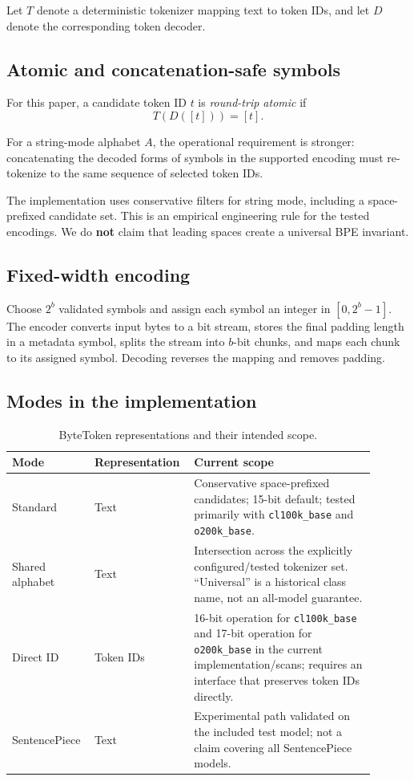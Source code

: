 \documentclass[11pt,a4paper]{article}
\begin{document}
Let \(T\) denote a deterministic tokenizer mapping text to token IDs, and let \(D\) denote the corresponding token decoder.

\subsection{Atomic and concatenation-safe symbols}

For this paper, a candidate token ID \(t\) is \emph{round-trip atomic} if
\[
T(D([t])) = [t].
\]

For a string-mode alphabet \(A\), the operational requirement is stronger: concatenating the decoded forms of symbols in the supported encoding must re-tokenize to the same sequence of selected token IDs.

The implementation uses conservative filters for string mode, including a space-prefixed candidate set. This is an empirical engineering rule for the tested encodings. We do \textbf{not} claim that leading spaces create a universal BPE invariant.

\subsection{Fixed-width encoding}

Choose \(2^b\) validated symbols and assign each symbol an integer in \([0,2^b-1]\). The encoder converts input bytes to a bit stream, stores the final padding length in a metadata symbol, splits the stream into \(b\)-bit chunks, and maps each chunk to its assigned symbol. Decoding reverses the mapping and removes padding.

\subsection{Modes in the implementation}

\begin{table}[h]
\centering
\begin{tabular}{p{0.20\linewidth}p{0.22\linewidth}p{0.48\linewidth}}
\toprule
Mode & Representation & Current scope \\
\midrule
Standard & Text & Conservative space-prefixed candidates; 15-bit default; tested primarily with \texttt{cl100k\_base} and \texttt{o200k\_base}. \\
Shared alphabet & Text & Intersection across the explicitly configured/tested tokenizer set. ``Universal'' is a historical class name, not an all-model guarantee. \\
Direct ID & Token IDs & 16-bit operation for \texttt{cl100k\_base} and 17-bit operation for \texttt{o200k\_base} in the current implementation/scans; requires an interface that preserves token IDs directly. \\
SentencePiece & Text & Experimental path validated on the included test model; not a claim covering all SentencePiece models. \\
\bottomrule
\end{tabular}
\caption{ByteToken representations and their intended scope.}
\end{table}
\end{document}

